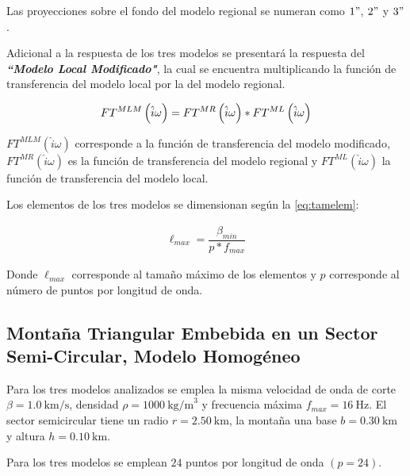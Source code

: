 \documentclass[spanish,letterpaper,12pt,twoside,openany]{article}
\begin{document}
Las proyecciones sobre el fondo del modelo regional se numeran como $1"$, $2"$ y $3"$.

Adicional a la respuesta de los tres modelos se presentará la respuesta del \textbf{\textit{``Modelo Local Modificado"}}, la cual se encuentra multiplicando la función de transferencia del modelo local por la del modelo regional.
%
\begin{large}
	\begin{align}\label{eq:eqftmod}
		FT^{MLM} \left(\hat{i} \omega \right)= FT^{MR} \left(\hat{i} \omega \right) * FT^{ML} \left(\hat{i} \omega \right) 
		\vspace{-1 cm}
	\end{align}
\end{large}
%
$FT^{MLM} \left(\hat{i} \omega \right)$ corresponde a la función de transferencia del modelo modificado, $FT^{MR} \left(\hat{i} \omega \right)$ es la función de transferencia del modelo regional y $FT^{ML} \left(\hat{i} \omega \right)$ la función de transferencia del modelo local.

Los elementos de los tres modelos se dimensionan según la \cref{eq:tamelem}:
%
\begin{large}
	\begin{align}\label{eq:tamelem}
		\ell_{max} = \dfrac{\beta_{min}}{p * f_{max}}
 	\end{align}
\end{large}
%
Donde $\ell_{max}$ corresponde al tamaño máximo de los elementos y $p$ corresponde al número de puntos por longitud de onda.
%
\subsection{Montaña Triangular Embebida en un Sector Semi-Circular, Modelo Homogéneo}
%
Para los tres modelos analizados se emplea la misma velocidad de onda de corte {$\beta = 1.0\ \text{km/s}$}, densidad $\rho = 1000\ \text{kg/m}^3$ y frecuencia máxima $f_{max} =  16\ \text{Hz}$. El sector semicircular tiene un radio $r=2.50\ \text{km}$, la montaña una base $b=0.30\ \text{km}$ y altura $h=0.10\ \text{km}$.

Para los tres modelos se emplean $24$ puntos por longitud de onda $\left( p = 24 \right)$.
\end{document}
